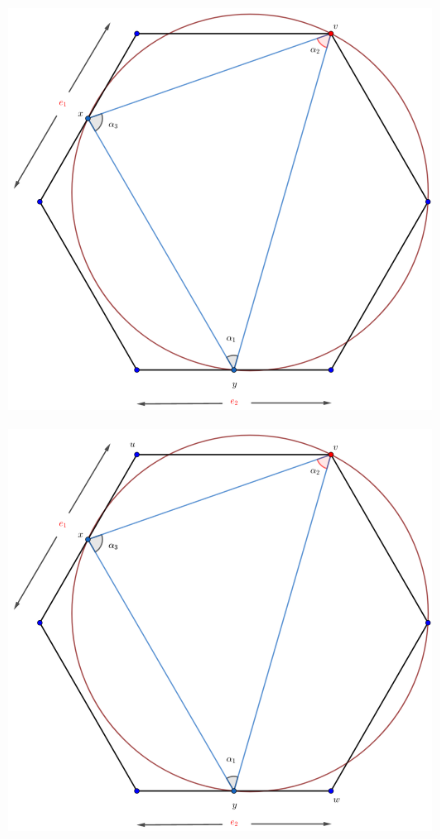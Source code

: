 {\begin{frame}
  \begin{figure}
    \centering
    \includegraphics[width=.65 \paperwidth]{./images/Bosquejo2.png}
  \end{figure}
\end{frame}

\begin{frame}
  \begin{figure}
    \centering
    \includegraphics[width=.65 \paperwidth]{./images/Bosquejo3.png}
  \end{figure}
\end{frame}

}
